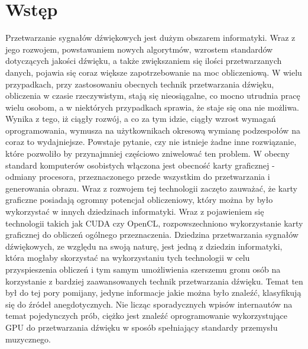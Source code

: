 \chapter*{Wstęp}

Przetwarzanie sygnałów dźwiękowych jest dużym obszarem informatyki. Wraz z jego rozwojem, powstawaniem nowych algorytmów, wzrostem standardów dotyczących jakości dźwięku, a także zwiększaniem się ilości przetwarzanych danych, pojawia się coraz większe zapotrzebowanie na moc obliczeniową. W wielu przypadkach, przy zastosowaniu obecnych technik przetwarzania dźwięku, obliczenia w czasie rzeczywistym, stają się nieosiągalne, co mocno utrudnia pracę wielu osobom, a w niektórych przypadkach sprawia, że staje się ona nie możliwa. Wynika z tego, iż ciągły rozwój, a co za tym idzie, ciągły wzrost wymagań oprogramowania, wymusza na użytkownikach okresową wymianę podzespołów na coraz to wydajniejsze. Powstaje pytanie, czy nie istnieje żadne inne rozwiązanie, które pozwoliło by przynajmniej częściowo zniwelować ten problem. W obecny standard komputerów osobistych włączona jest obecność karty graficznej - odmiany procesora, przeznaczonego przede wszystkim do przetwarzania i generowania obrazu. Wraz z rozwojem tej technologii zaczęto zauważać, że karty graficzne posiadają ogromny potencjał obliczeniowy, który można by było wykorzystać w innych dziedzinach informatyki. Wraz z pojawieniem się technologii takich jak CUDA czy OpenCL, rozpowszechniono wykorzystanie karty graficznej do obliczeń ogólnego przeznaczenia. Dziedzina przetwarzania sygnałów dźwiękowych, ze względu na swoją naturę, jest jedną z dziedzin informatyki, która mogłaby skorzystać na wykorzystaniu tych technologii w celu przyspieszenia obliczeń i tym samym umożliwienia szerszemu gronu osób na korzystanie z bardziej zaawansowanych technik przetwarzania dźwięku. Temat ten był do tej pory pomijany, jedyne informacje jakie można było znaleźć, klasyfikują się do źródeł anegdotycznych. Nie licząc sporadycznych wpisów internautów na temat pojedynczych prób, ciężko jest znaleźć oprogramowanie wykorzystujące GPU do przetwarzania dźwięku w sposób spełniający standardy przemysłu muzycznego.
